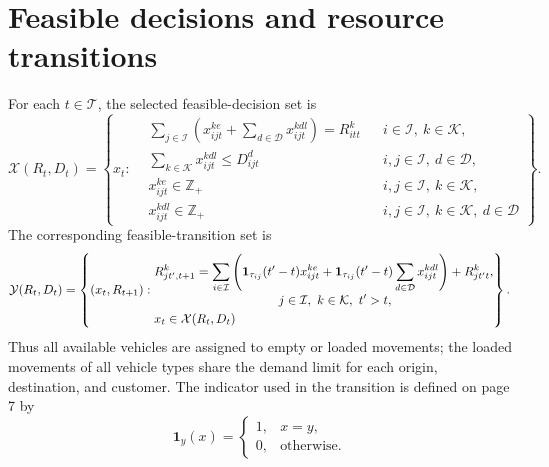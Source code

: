 \documentclass{article}
\begin{document}
\section*{Feasible decisions and resource transitions}
For each \(t\in\mathcal{T}\), the selected feasible-decision set is
\[
\mathcal{X}(R_t,D_t)=
\left\{x_t:\begin{aligned}
&\sum_{j\in\mathcal{I}}\left(x_{ijt}^{ke}+\sum_{d\in\mathcal{D}}x_{ijt}^{kdl}\right)=R_{itt}^{k}
&&i\in\mathcal{I},\ k\in\mathcal{K},\\
&\sum_{k\in\mathcal{K}}x_{ijt}^{kdl}\leq D_{ijt}^{d}
&&i,j\in\mathcal{I},\ d\in\mathcal{D},\\
&x_{ijt}^{ke}\in\mathbb{Z}_{+}
&&i,j\in\mathcal{I},\ k\in\mathcal{K},\\
&x_{ijt}^{kdl}\in\mathbb{Z}_{+}
&&i,j\in\mathcal{I},\ k\in\mathcal{K},\ d\in\mathcal{D}
\end{aligned}\right\}.
\]
The corresponding feasible-transition set is
\[
\mathcal{Y}(R_t,D_t)=
\left\{(x_t,R_{t+1}):\begin{aligned}
&R_{jt',t+1}^{k}=\sum_{i\in\mathcal{I}}\left(
\mathbf{1}_{\tau_{ij}}(t'-t)x_{ijt}^{ke}
+\mathbf{1}_{\tau_{ij}}(t'-t)\sum_{d\in\mathcal{D}}x_{ijt}^{kdl}
\right)+R_{jt't}^{k},\\[-1mm]
&\hspace{35mm}j\in\mathcal{I},\ k\in\mathcal{K},\ t'>t,\\
&x_t\in\mathcal{X}(R_t,D_t)
\end{aligned}\right\}.
\]
Thus all available vehicles are assigned to empty or loaded movements; the loaded movements of all vehicle types share the demand limit for each origin, destination, and customer. The indicator used in the transition is defined on page 7 by
\[
\mathbf{1}_{y}(x)=
\begin{cases}
1,&x=y,\\
0,&\text{otherwise}.
\end{cases}
\]
\end{document}
